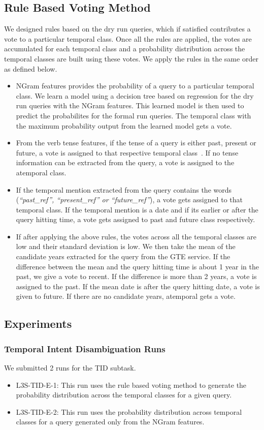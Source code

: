 \documentclass{sig-alternate}
\begin{document}
\subsection{Rule Based Voting Method}
We designed rules based on the dry run queries, which if satisfied contributes a vote to a particular temporal class. Once all the rules are applied, the votes are accumulated for each temporal class and a probability distribution across the temporal classes are built using these votes. We apply the rules in the same order as defined below.
\begin{itemize}
\item \textsf{NGram features} provides the probability of a query to a particular temporal class. We learn a model using a decision tree based on regression for the dry run queries with the NGram features. This learned model is then used to predict the probabilites for the formal run queries. The temporal class with the maximum probability output from the learned model gets a vote.
\item From the \textsf{verb tense features}, if the tense of a query is either past, present or future, a vote is assigned to that respective temporal class~\cite{hitsz}. If no tense information can be extracted from the query, a vote is assigned to the atemporal class.
\item If the \textsf{temporal mention} extracted from the query contains the words (\textit{``past\_ref'', ``present\_ref'' or ``future\_ref''}), a vote gets assigned to that temporal class. If the temporal mention is a date and if its earlier or after the query hitting time, a vote gets assigned to past and future class respectively.
\item If after applying the above rules, the votes across all the temporal classes are low and their standard deviation is low. We then take the mean of the candidate years extracted for the query from the \textsf{GTE service}. If the difference between the mean and the query hitting time is about 1 year in the past, we give a vote to recent. If the difference is more than 2 years, a vote is assigned to the past. If the mean date is after the query hitting date, a vote is given to future. If there are no candidate years, atemporal gets a vote.
\end{itemize}
\subsection{Experiments}
\subsubsection{Temporal Intent Disambiguation Runs}
We submitted 2 runs for the TID subtask.
\begin{itemize}
\item \textsf{L3S-TID-E-1}: This run uses the \textsf{rule based voting method} to generate the probability distribution across the temporal classes for a given query.
\item \textsf{L3S-TID-E-2}: This run uses the probability distribution across temporal classes for a query generated only from the \textsf{NGram features}.
\end{itemize}
\end{document}
